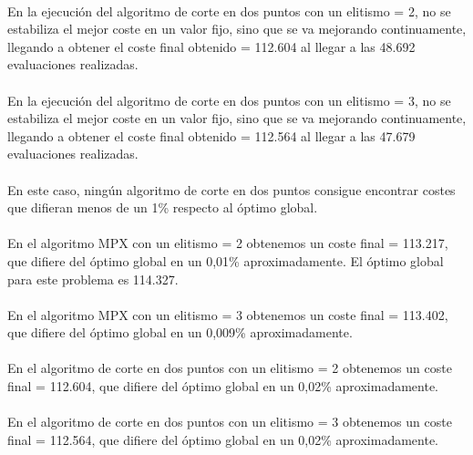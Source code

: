 	\paragraph{}En la ejecución del algoritmo de corte en dos puntos con un elitismo = 2, no se estabiliza el mejor coste en un valor fijo, sino que se va mejorando continuamente, llegando a obtener el coste final obtenido = 112.604 al llegar a las 48.692 evaluaciones realizadas.
	
	\paragraph{}En la ejecución del algoritmo de corte en dos puntos con un elitismo = 3, no se estabiliza el mejor coste en un valor fijo, sino que se va mejorando continuamente, llegando a obtener el coste final obtenido = 112.564 al llegar a las 47.679 evaluaciones realizadas.
	
	\paragraph{}En este caso, ningún algoritmo de corte en dos puntos consigue encontrar costes que difieran menos de un 1\% respecto al óptimo global.
	
	\paragraph{}En el algoritmo MPX con un elitismo = 2 obtenemos un coste final = 113.217, que difiere del óptimo global en un 0,01\% aproximadamente. El óptimo global para este problema es 114.327.
	
	\paragraph{}En el algoritmo MPX con un elitismo = 3 obtenemos un coste final = 113.402, que difiere del óptimo global en un 0,009\% aproximadamente.
	
	\paragraph{}En el algoritmo de corte en dos puntos con un elitismo = 2 obtenemos un coste final = 112.604, que difiere del óptimo global en un 0,02\% aproximadamente.
	
	\paragraph{}En el algoritmo de corte en dos puntos con un elitismo = 3 obtenemos un coste final = 112.564, que difiere del óptimo global en un 0,02\% aproximadamente.

